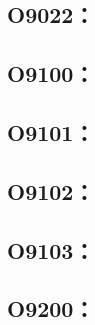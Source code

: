 \subsection{O9022：}



\clearpage
\subsection{O9100：}



\clearpage
\subsection{O9101：}



\clearpage
\subsection{O9102：}



\clearpage
\subsection{O9103：}



\clearpage
\subsection{O9200：}



